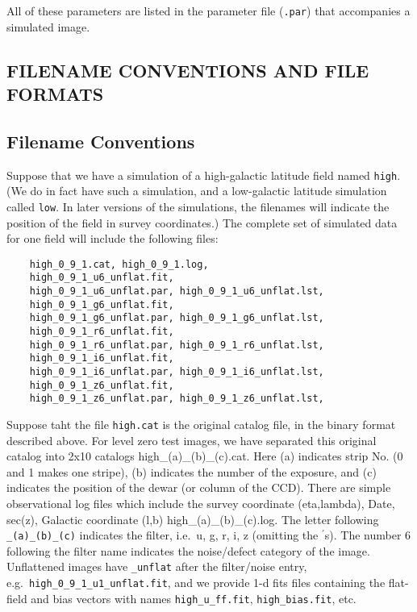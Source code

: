 All of these parameters are listed in the parameter file ({\tt *.par}) that
accompanies a simulated image.

\begin{center}
\bigskip
\section{ FILENAME CONVENTIONS AND FILE FORMATS}
\smallskip
\end{center}

\vspace{10pt}
\subsection{Filename Conventions}

Suppose that we have a simulation of a high-galactic latitude field
named {\tt high}.  (We do in fact have such a 
simulation, and a low-galactic latitude simulation called {\tt low}.
In later versions of the simulations, the filenames will indicate the
position of the field in survey coordinates.)  
The complete set of simulated data for one field will include the following 
files:
\begin{verbatim}
    high_0_9_1.cat, high_0_9_1.log,
    high_0_9_1_u6_unflat.fit, 
    high_0_9_1_u6_unflat.par, high_0_9_1_u6_unflat.lst,
    high_0_9_1_g6_unflat.fit,
    high_0_9_1_g6_unflat.par, high_0_9_1_g6_unflat.lst,
    high_0_9_1_r6_unflat.fit,
    high_0_9_1_r6_unflat.par, high_0_9_1_r6_unflat.lst,
    high_0_9_1_i6_unflat.fit,
    high_0_9_1_i6_unflat.par, high_0_9_1_i6_unflat.lst,
    high_0_9_1_z6_unflat.fit,
    high_0_9_1_z6_unflat.par, high_0_9_1_z6_unflat.lst,
\end{verbatim}

Suppose taht the file {\tt high.cat} is the original catalog file, 
in the binary format described above.
For level zero test images, we have separated this original catalog 
into 2x10 catalogs high\_(a)\_(b)\_(c).cat.
Here (a) indicates strip No. (0 and 1 makes one stripe), 
(b) indicates the number of the exposure, and (c) indicates the 
position of the dewar (or column of the CCD). 
There are simple observational log files which include
the survey coordinate (eta,lambda), Date, sec(z), Galactic coordinate (l,b)
high\_(a)\_(b)\_(c).log.
The letter following {\tt \_(a)\_(b)\_(c)} indicates the filter, i.e.\ u, g,
r, i, z (omitting the $^\prime$s).
The number $6$ following the filter
name indicates the noise/defect category of the image.
Unflattened images have {\tt \_unflat} after the filter/noise
entry, e.g.\ {\tt high\_0\_9\_1\_u1\_unflat.fit}, and we provide 1-d fits
files containing the flat-field and bias vectors with names 
{\tt high\_u\_ff.fit}, {\tt high\_bias.fit}, etc. 

